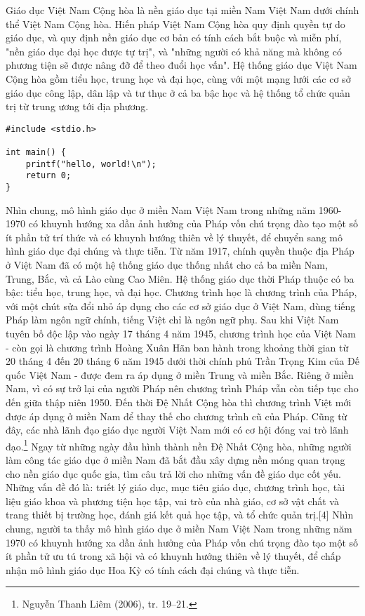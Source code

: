 \documentclass[../thesis.tex]{subfiles}
\begin{document}
Giáo dục Việt Nam Cộng hòa là nền giáo dục tại miền Nam Việt Nam dưới chính thể Việt Nam Cộng hòa.
Hiến pháp Việt Nam Cộng hòa quy định quyền tự do giáo dục, và quy định nền giáo dục cơ bản có tính cách bắt buộc và miễn phí, "nền giáo dục đại học được tự trị", và "những người có khả năng mà không có phương tiện sẽ được nâng đỡ để theo đuổi học vấn". Hệ thống giáo dục Việt Nam Cộng hòa gồm tiểu học, trung học và đại học, cùng với một mạng lưới các cơ sở giáo dục công lập, dân lập và tư thục ở cả ba bậc học và hệ thống tổ chức quản trị từ trung ương tới địa phương.
\begin{lstlisting}
#include <stdio.h>

int main() {
	printf("hello, world!\n");
	return 0;
}
\end{lstlisting}
Nhìn chung, mô hình giáo dục ở miền Nam Việt Nam trong những năm 1960-1970 có khuynh hướng xa dần ảnh hưởng của Pháp vốn chú trọng đào tạo một số ít phần tử trí thức và có khuynh hướng thiên về lý thuyết, để chuyển sang mô hình giáo dục đại chúng và thực tiễn.
Từ năm 1917, chính quyền thuộc địa Pháp ở Việt Nam đã có một hệ thống giáo dục thống nhất cho cả ba miền Nam, Trung, Bắc, và cả Lào cùng Cao Miên. Hệ thống giáo dục thời Pháp thuộc có ba bậc: tiểu học, trung học, và đại học. Chương trình học là chương trình của Pháp, với một chút sửa đổi nhỏ áp dụng cho các cơ sở giáo dục ở Việt Nam, dùng tiếng Pháp làm ngôn ngữ chính, tiếng Việt chỉ là ngôn ngữ phụ. Sau khi Việt Nam tuyên bố độc lập vào ngày 17 tháng 4 năm 1945, chương trình học của Việt Nam - còn gọi là chương trình Hoàng Xuân Hãn ban hành trong khoảng thời gian từ 20 tháng 4 đến 20 tháng 6 năm 1945 dưới thời chính phủ Trần Trọng Kim của Đế quốc Việt Nam - được đem ra áp dụng ở miền Trung và miền Bắc. Riêng ở miền Nam, vì có sự trở lại của người Pháp nên chương trình Pháp vẫn còn tiếp tục cho đến giữa thập niên 1950. Đến thời Đệ Nhất Cộng hòa thì chương trình Việt mới được áp dụng ở miền Nam để thay thế cho chương trình cũ của Pháp. Cũng từ đây, các nhà lãnh đạo giáo dục người Việt Nam mới có cơ hội đóng vai trò lãnh đạo.\footnote{Nguyễn Thanh Liêm (2006), tr. 19–21.}
Ngay từ những ngày đầu hình thành nền Đệ Nhất Cộng hòa, những người làm công tác giáo dục ở miền Nam đã bắt đầu xây dựng nền móng quan trọng cho nền giáo dục quốc gia, tìm câu trả lời cho những vấn đề giáo dục cốt yếu. Những vấn đề đó là: triết lý giáo dục, mục tiêu giáo dục, chương trình học, tài liệu giáo khoa và phương tiện học tập, vai trò của nhà giáo, cơ sở vật chất và trang thiết bị trường học, đánh giá kết quả học tập, và tổ chức quản trị.[4] Nhìn chung, người ta thấy mô hình giáo dục ở miền Nam Việt Nam trong những năm 1970 có khuynh hướng xa dần ảnh hưởng của Pháp vốn chú trọng đào tạo một số ít phần tử ưu tú trong xã hội và có khuynh hướng thiên về lý thuyết, để chấp nhận mô hình giáo dục Hoa Kỳ có tính cách đại chúng và thực tiễn.
\end{document}

